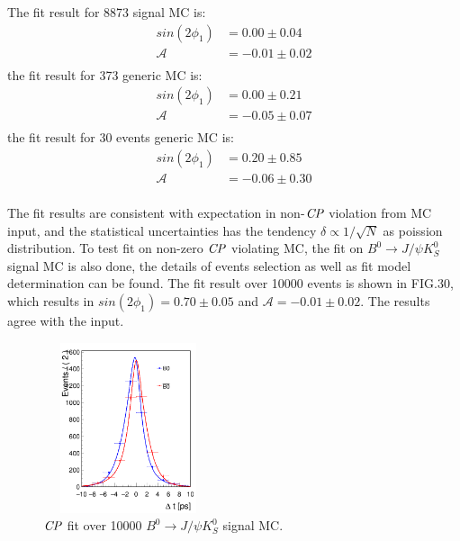 The fit result for 8873 signal MC is:
\begin{equation}
\begin{split}
sin(2\phi_1) & = 0.00 \pm 0.04 \\
\mathcal{A} & = -0.01 \pm 0.02\\
\end{split}
\end{equation} 
the fit result for 373 generic MC is:
\begin{equation}
\begin{split}
sin(2\phi_1) & = 0.00 \pm 0.21 \\
\mathcal{A} & = -0.05 \pm 0.07\\
\end{split}
\end{equation} 
the fit result for 30 events generic MC is:
\begin{equation}
\begin{split}
sin(2\phi_1) & = 0.20 \pm 0.85 \\
\mathcal{A} & = -0.06 \pm 0.30\\
\end{split}
\end{equation} 

The fit results are consistent with expectation in non-$\it{CP}$ violation from MC input, and the statistical uncertainties has the tendency $\delta \propto 1/\sqrt{N}$ as poission distribution. To test fit on non-zero $\it{CP}$ violating MC, the fit on $B^0\to J/\psi K_S^0$ signal MC is also done, the details of events selection as well as fit model determination can be found\cite{jpsiks_ichep}. The fit result over 10000 events is shown in FIG.30, which results in $sin(2\phi_1) = 0.70 \pm 0.05 $ and $\mathcal{A} = -0.01\pm 0.02$. The results agree with the input.
\begin{figure}[H]
	\centering
	\includegraphics[height=5cm,width=5cm]{figures/jpsiks_cpfit10000}
	\caption{$\it{CP}$ fit over 10000 $B^0\to J/\psi K_S^0$ signal MC. }
\end{figure}


